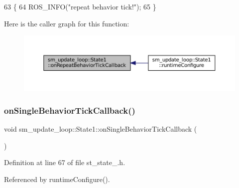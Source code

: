 \begin{DoxyCode}
63     \{
64         ROS\_INFO(\textcolor{stringliteral}{"repeat behavior tick!"});
65     \}
\end{DoxyCode}
Here is the caller graph for this function\+:
\nopagebreak
\begin{figure}[H]
\begin{center}
\leavevmode
\includegraphics[width=350pt]{structsm__update__loop_1_1State1_aba8ce8c18482665237b1a5cb28deb657_icgraph}
\end{center}
\end{figure}
\mbox{\label{structsm__update__loop_1_1State1_ad15fb64f4f918c423038180d434d7220}} 
\subsubsection{\texorpdfstring{on\+Single\+Behavior\+Tick\+Callback()}{onSingleBehaviorTickCallback()}}
{\footnotesize\ttfamily void sm\+\_\+update\+\_\+loop\+::\+State1\+::on\+Single\+Behavior\+Tick\+Callback (\begin{DoxyParamCaption}{ }\end{DoxyParamCaption})\hspace{0.3cm}{\ttfamily [inline]}}



Definition at line 67 of file st\+\_\+state\+\_.\+h.



Referenced by runtime\+Configure().


